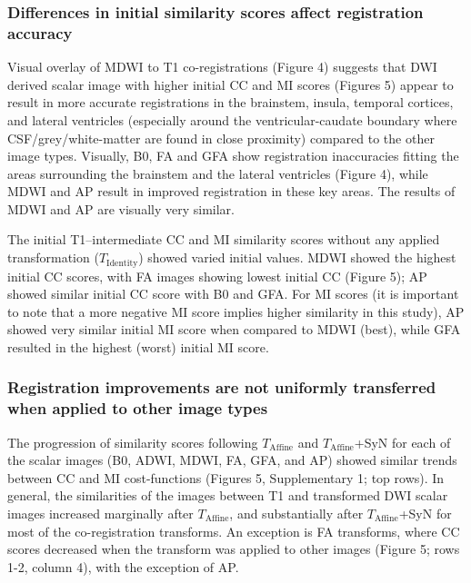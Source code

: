 \subsubsection{Differences in initial similarity scores affect registration accuracy}
Visual overlay of MDWI to T1 co-registrations (Figure 4) suggests that DWI derived scalar image with higher initial CC and MI scores (Figures 5) appear to result in more accurate registrations in the brainstem, insula, temporal cortices, and lateral ventricles (especially around the ventricular-caudate boundary where CSF/grey/white-matter are found in close proximity) compared to the other image types. Visually, B0, FA and GFA show registration inaccuracies fitting the areas surrounding the brainstem and the lateral ventricles (Figure 4), while MDWI and AP result in improved registration in these key areas. The results of MDWI and AP are visually very similar.

The initial T1–intermediate CC and MI similarity scores without any applied transformation ($T_{\text{Identity}}$) showed varied initial values. MDWI showed the highest initial CC scores, with FA images showing lowest initial CC (Figure 5); AP showed similar initial CC score with B0 and GFA. For MI scores (it is important to note that a more negative MI score implies higher similarity in this study), AP showed very similar initial MI score when compared to MDWI (best), while GFA resulted in the highest (worst) initial MI score.

\subsubsection{Registration improvements are not uniformly transferred when applied to other image types}
The progression of similarity scores following $T_{\text{Affine}}$ and $T_{\text{Affine}}$+SyN for each of the scalar images (B0, ADWI, MDWI, FA, GFA, and AP) showed similar trends between CC and MI cost-functions (Figures 5,  Supplementary 1; top rows). In general, the similarities of the images between T1 and transformed DWI scalar images increased marginally after $T_{\text{Affine}}$, and substantially after $T_{\text{Affine}}$+SyN for most of the co-registration transforms. An exception is FA transforms, where CC scores decreased when the transform was applied to other images (Figure 5; rows 1-2, column 4), with the exception of AP. 

